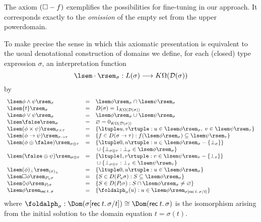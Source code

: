 The axiom $({\Box}-{\sl f})$ exemplifies the possibilities for
fine-tuning in our approach. It corresponds exactly to the
{\em omission} of the empty set from the upper powerdomain.

To make precise the sense in which this axiomatic presentation is
equivalent to the usual denotational construction of domains we define,
for each (closed) type expression $\sigma$, an interpretation function
\[ \lsem \cdot \rsem_{\sigma } : L(\sigma ) \longrightarrow K \Omega (\cal D 
(\sigma ) ) \]
by
\[ \begin{array}{lll}
\lsem \phi \wedge \psi \rsem_{\sigma} & = & \lsem \phi \rsem_{\sigma} \cap
\lsem \psi \rsem_{\sigma} \\
\lsem {\sl t} \rsem_{\sigma} & = & D(\sigma ) = 1_{K \Omega (\cal D (\sigma ))} 
\\
\lsem \phi \vee \psi \rsem_{\sigma} & = & \lsem \phi \rsem_{\sigma} \cup
\lsem \psi \rsem_{\sigma} \\
\lsem \false \rsem_{\sigma} & = & \varnothing = 0_{K \Omega (\cal D (\sigma ))}
\\
\lsem (\phi \times \psi ) \rsem_{\sigma \times \tau} & = & 
\{ \ltuple u, v \rtuple : u \in \lsem \phi \rsem_{\sigma}, \; v \in \lsem \psi
\rsem_{\tau} \} \\
\lsem (\phi \rightarrow \psi ) \rsem_{\sigma \rightarrow \tau} & = &
\{ f \in D(\sigma \rightarrow \tau ) : f(\lsem \phi \rsem_{\sigma })
\subseteq \lsem \psi \rsem_{\tau} \} \\
\lsem (\phi \oplus \false ) \rsem_{\sigma \oplus \tau} & = &
\{ \ltuple 0, u \rtuple : u \in \lsem \phi \rsem_{\sigma} - \{ \bot_{\sigma} \} \} \\
&  & \mbox{} \cup \{ \bot_{\sigma \oplus \tau} : \bot_{\sigma} \in \lsem \phi \rsem_{\sigma} \} \\
\lsem (\false \oplus \psi ) \rsem_{\sigma \oplus \tau} & = &
\{ \ltuple 1, v \rtuple : v \in \lsem \psi \rsem_{\tau} - \{ \bot_{\tau} \} \} \\
& & \mbox{} \cup \{ \bot_{\sigma \oplus \tau} : \bot_{\tau} \in \lsem \psi \rsem_{\tau} \} \\
\lsem (\phi )_{\bot} \rsem_{(\sigma )_{\bot}} & = & \{ \ltuple 0, u \rtuple :
u \in \lsem \phi \rsem_{\sigma} \} \\
\lsem \Box \phi \rsem_{P_{u} \sigma } & = & \{ S \in D(P_{u} \sigma ) :
S \subseteq \lsem \phi \rsem_{\sigma} \} \\
\lsem \Diamond \phi \rsem_{P_{l} \sigma } & = & \{ S \in D(P_{l} \sigma ) : 
S \cap \lsem \phi \rsem_{\sigma} \neq \varnothing \} \\
\lsem \phi \rsem_{{\sf rec} \: t. \, \sigma} & = & 
\{ {\foldalph}_{\sigma}(u) : u \in \lsem \phi \rsem_{\sigma [{\sf rec} \: t. \, {\sigma}/ t]} \}
\end{array} \] 
where ${\foldalph}_{\sigma} : \Dom (\sigma [{\sf rec} \: t. \, {\sigma}/t]) \cong \Dom ({\sf rec} \: t. \, \sigma )$\label{foldalph} is the isomorphism
arising from the initial solution to the domain equation $t = \sigma (t)$.

